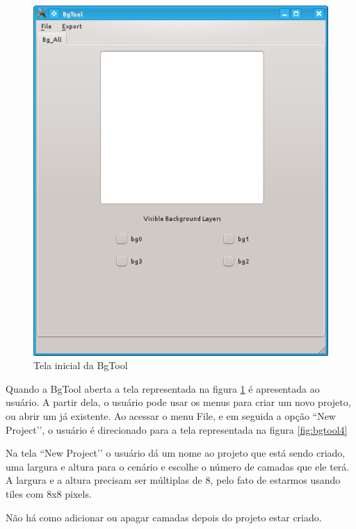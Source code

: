\documentclass[brazil]{abnt}
\begin{document}
\begin{figure}[h!]
\centering
\includegraphics[scale=.5]{imgs/bgtool3.png}
\caption{Tela inicial da BgTool}
\label{fig:bgtool3}
\end{figure}

Quando a BgTool aberta a tela representada na figura \ref{fig:bgtool3} é apresentada ao usuário. A partir dela, o usuário pode usar os menus para criar um novo projeto, ou abrir um já existente. Ao acessar o menu File, e em seguida a opção ``New Project’’, o usuário é direcionado para a tela representada na figura \ref{fig:bgtool4}

Na tela ``New Project’’ o usuário dá um nome ao projeto que está sendo criado, uma largura e altura para o cenário e escolhe o número de camadas que ele terá. A largura e a altura precisam ser múltiplas de 8, pelo fato de estarmos usando tiles com 8x8 pixels.

Não há como adicionar ou apagar camadas depois do projeto estar criado.
\end{document}
